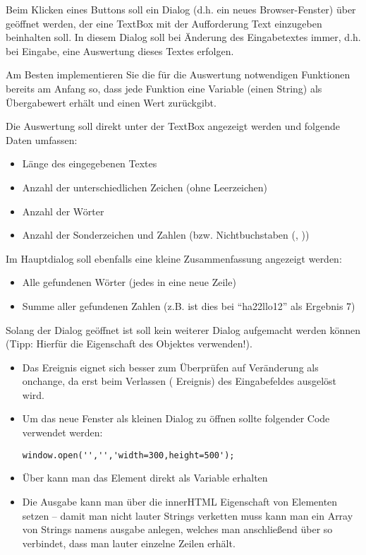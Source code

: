 %
\par Beim Klicken eines Buttons soll ein Dialog (d.h. ein neues Browser-Fenster) über  geöffnet werden, der eine TextBox mit der Aufforderung Text einzugeben beinhalten soll. In diesem Dialog soll bei Änderung des Eingabetextes immer, d.h. bei Eingabe, eine Auswertung dieses Textes erfolgen.
%
\par Am Besten implementieren Sie die für die Auswertung notwendigen Funktionen bereits am Anfang so, dass jede Funktion eine Variable (einen String) als Übergabewert erhält und einen Wert zurückgibt.
%
\par Die Auswertung soll direkt unter der TextBox angezeigt werden und folgende Daten umfassen:
%
\begin{itemize}
\item Länge des eingegebenen Textes
\item Anzahl der unterschiedlichen Zeichen (ohne Leerzeichen)
\item Anzahl der Wörter
\item Anzahl der Sonderzeichen und Zahlen (bzw. Nichtbuchstaben (, ))
\end{itemize}
%
\par Im Hauptdialog soll ebenfalls eine kleine Zusammenfassung angezeigt werden:
%
\begin{itemize}
\item Alle gefundenen Wörter (jedes in eine neue Zeile)
\item Summe aller gefundenen Zahlen (z.B. ist dies bei ``ha22llo12'' als Ergebnis 7)
\end{itemize}
%
\par Solang der Dialog geöffnet ist soll kein weiterer Dialog aufgemacht werden können (Tipp: Hierfür die Eigenschaft  des  Objektes verwenden!).
%
%
\begin{itemize}
\item Das Ereignis  eignet sich besser zum Überprüfen auf Veränderung als onchange, da  erst beim Verlassen ( Ereignis) des Eingabefeldes ausgelöst wird.
\item Um das neue Fenster als kleinen Dialog zu öffnen sollte folgender Code verwendet werden:
%
\begin{lstlisting}
window.open('','','width=300,height=500');
\end{lstlisting}
%
\item Über  kann man das Element direkt als Variable erhalten
\item Die Ausgabe kann man über die innerHTML Eigenschaft von Elementen setzen – damit man nicht lauter Strings verketten muss kann man ein Array von Strings namens ausgabe anlegen, welches man anschließend über  so verbindet, dass man lauter einzelne Zeilen erhält.
\end{itemize}
%